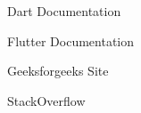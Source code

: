 \cleardoublepage
{}
{}
\begin{thebibliography}{99}

Dart Documentation

Flutter Documentation

Geeksforgeeks Site

StackOverflow

\end{thebibliography}
